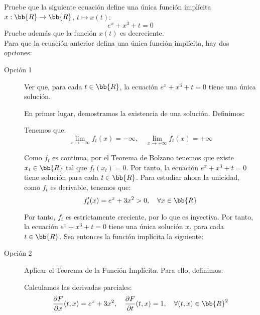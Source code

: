 \documentclass[12pt]{article}
\begin{document}
    \begin{ejercicio}
        Pruebe que la siguiente ecuación define una única función implícita $x: \bb{R} \to \bb{R}$, $t \mapsto x(t)$:
        \begin{equation*}
            e^x + x^3 + t = 0
        \end{equation*}
        Pruebe además que la función $x(t)$ es decreciente.\\

        Para que la ecuación anterior defina una única función implícita, hay dos opciones:
        \begin{description}
            \item[Opción 1] Ver que, para cada $t\in\bb{R}$, la ecuación $e^x + x^3 + t = 0$ tiene una única solución.
            
            En primer lugar, demostramos la existencia de una solución. Definimos:

            Tenemos que:
            \begin{equation*}
                \lim_{x\to-\infty} f_t(x) = -\infty, \quad \lim_{x\to+\infty} f_t(x) = +\infty
            \end{equation*}

            Como $f_t$ es continua, por el Teorema de Bolzano tenemos que existe $x_t\in\bb{R}$ tal que $f_t(x_t) = 0$. Por tanto, la ecuación $e^x + x^3 + t = 0$ tiene solución para cada $t\in\bb{R}$.
            Para estudiar ahora la unicidad, como $f_t$ es derivable, tenemos que:
            \begin{equation*}
                f_t'(x) = e^x + 3x^2 > 0, \quad \forall x\in\bb{R}
            \end{equation*}

            Por tanto, $f_t$ es estrictamente creciente, por lo que es inyectiva. Por tanto, la ecuación $e^x + x^3 + t = 0$ tiene una única solución $x_t$ para cada $t\in\bb{R}$.
            Sea entonces la función implícita la siguiente:

            \item[Opción 2] Aplicar el Teorema de la Función Implícita. Para ello, definimos:

            Calculamos las derivadas parciales:
            \begin{equation*}
                \dfrac{\partial F}{\partial x}(t,x) = e^x + 3x^2, \quad \dfrac{\partial F}{\partial t}(t,x) = 1, \quad \forall (t,x)\in\bb{R}^2
            \end{equation*}


\end{description}
\end{ejercicio}
\end{document}
